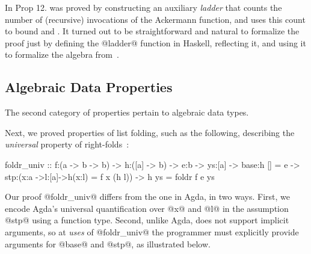 
%
%
In \citep{ackermann} Prop 12. was proved by constructing
an auxiliary \emph{ladder} that counts the number of
(recursive) invocations of the Ackermann function, and
uses this count to bound  and .
%
It turned out to be straightforward and natural
to formalize the proof just by defining the
@ladder@ function in Haskell, reflecting it,
and using it to formalize the algebra from~\citep{ackermann}.

\subsection{Algebraic Data Properties}
\label{subsec:fold}

The second category of properties pertain to
algebraic data types.

%
Next, we proved properties of list folding, such as
the following, describing the \emph{universal}
property of right-folds~\citep{agdaequational}:
%
\begin{code}
foldr_univ
  :: f:(a -> b -> b)
  -> h:([a] -> b)
  -> e:b
  -> ys:[a]
  -> base:{h [] = e }
  -> stp:(x:a ->l:[a]->{h(x:l) = f x (h l)})
  -> {h ys = foldr f e ys}
\end{code}
%
Our proof @foldr_univ@ differs from the one in Agda,
in two ways.
%
First, we encode Agda's universal quantification over
@x@ and @l@ in the assumption @stp@ using a function type.
%
Second, unlike Agda, \toolname
does not support implicit arguments,
so at \emph{uses} of @foldr_univ@
the programmer must explicitly
provide arguments for @base@
and @stp@, as illustrated below.

